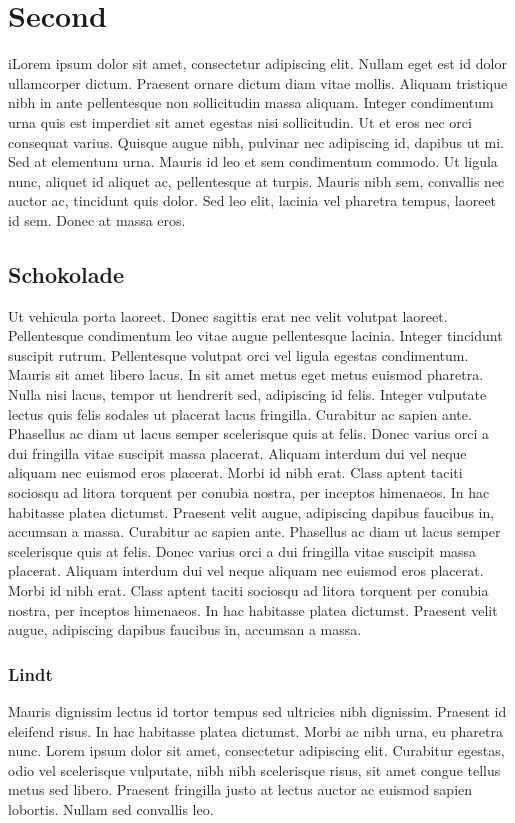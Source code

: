 \chapter{Second}
iLorem ipsum dolor sit amet, consectetur adipiscing elit. Nullam eget est id dolor ullamcorper dictum. Praesent ornare dictum diam vitae mollis. Aliquam tristique nibh in ante pellentesque non sollicitudin massa aliquam. Integer condimentum urna quis est imperdiet sit amet egestas nisi sollicitudin. Ut et eros nec orci consequat varius. Quisque augue nibh, pulvinar nec adipiscing id, dapibus ut mi. Sed at elementum urna. Mauris id leo et sem condimentum commodo. Ut ligula nunc, aliquet id aliquet ac, pellentesque at turpis. Mauris nibh sem, convallis nec auctor ac, tincidunt quis dolor. Sed leo elit, lacinia vel pharetra tempus, laoreet id sem. Donec at massa eros.

\section{Schokolade}
Ut vehicula porta laoreet. Donec sagittis erat nec velit volutpat laoreet. Pellentesque condimentum leo vitae augue pellentesque lacinia. Integer tincidunt suscipit rutrum. Pellentesque volutpat orci vel ligula egestas condimentum. Mauris sit amet libero lacus. In sit amet metus eget metus euismod pharetra. Nulla nisi lacus, tempor ut hendrerit sed, adipiscing id felis. Integer vulputate lectus quis felis sodales ut placerat lacus fringilla.
Curabitur ac sapien ante. Phasellus ac diam ut lacus semper scelerisque quis at felis. Donec varius orci a dui fringilla vitae suscipit massa placerat. Aliquam interdum dui vel neque aliquam nec euismod eros placerat. Morbi id nibh erat. Class aptent taciti sociosqu ad litora torquent per conubia nostra, per inceptos himenaeos. In hac habitasse platea dictumst. Praesent velit augue, adipiscing dapibus faucibus in, accumsan a massa.
Curabitur ac sapien ante. Phasellus ac diam ut lacus semper scelerisque quis at felis. Donec varius orci a dui fringilla vitae suscipit massa placerat. Aliquam interdum dui vel neque aliquam nec euismod eros placerat. Morbi id nibh erat. Class aptent taciti sociosqu ad litora torquent per conubia nostra, per inceptos himenaeos. In hac habitasse platea dictumst. Praesent velit augue, adipiscing dapibus faucibus in, accumsan a massa.
\subsection{Lindt}
Mauris dignissim lectus id tortor tempus sed ultricies nibh dignissim. Praesent id eleifend risus. In hac habitasse platea dictumst. Morbi ac nibh urna, eu pharetra nunc. Lorem ipsum dolor sit amet, consectetur adipiscing elit. Curabitur egestas, odio vel scelerisque vulputate, nibh nibh scelerisque risus, sit amet congue tellus metus sed libero. Praesent fringilla justo at lectus auctor ac euismod sapien lobortis. Nullam sed convallis leo.
